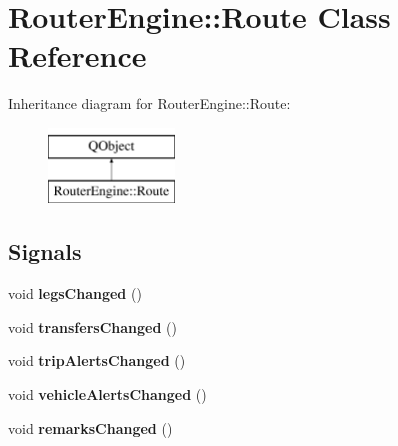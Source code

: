 \hypertarget{classRouterEngine_1_1Route}{}\section{Router\+Engine\+:\+:Route Class Reference}
\label{classRouterEngine_1_1Route}
Inheritance diagram for Router\+Engine\+:\+:Route\+:\begin{figure}[H]
\begin{center}
\leavevmode
\includegraphics[height=2.000000cm]{classRouterEngine_1_1Route}
\end{center}
\end{figure}
\subsection*{Signals}
\begin{DoxyCompactItemize}
\item 
\mbox{\label{classRouterEngine_1_1Route_a25ecf4bea955cc54810e48ed72b47146}} 
void {\bfseries legs\+Changed} ()
\item 
\mbox{\label{classRouterEngine_1_1Route_a5f23c83b0200aec7369ab1beff6edb21}} 
void {\bfseries transfers\+Changed} ()
\item 
\mbox{\label{classRouterEngine_1_1Route_a4dd9643a1f7991afdcb167296d9f2fac}} 
void {\bfseries trip\+Alerts\+Changed} ()
\item 
\mbox{\label{classRouterEngine_1_1Route_a1ea5875ee80dca0f253caee323f23410}} 
void {\bfseries vehicle\+Alerts\+Changed} ()
\item 
\mbox{\label{classRouterEngine_1_1Route_a42ba6dd381b51f8c9fb31bfd18386674}} 
void {\bfseries remarks\+Changed} ()
\end{DoxyCompactItemize}

